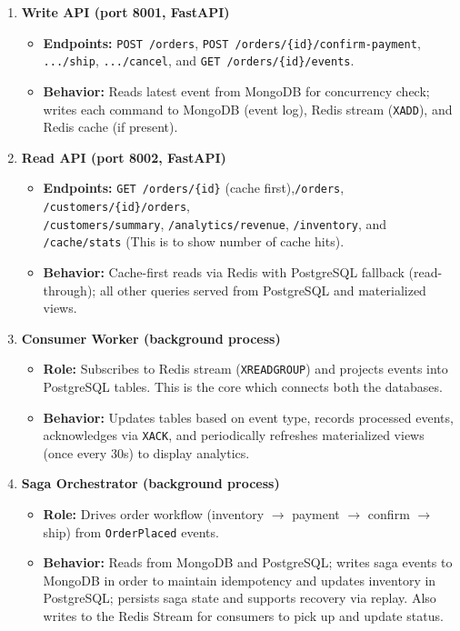 \documentclass[11pt,a4paper]{article}
\newcommand{\code}[1]{\texttt{\small #1}}
\begin{document}
\begin{enumerate}

  \item \textbf{Write API (port 8001, FastAPI)}
  \begin{itemize}
    \item \textbf{Endpoints:} \code{POST /orders}, \code{POST /orders/\{id\}/confirm-payment}, \code{.../ship}, \code{.../cancel}, and \code{GET /orders/\{id\}/events}.
    \item \textbf{Behavior:} Reads latest event from MongoDB for concurrency check; writes each command to MongoDB (event log), Redis stream (\code{XADD}), and Redis cache (if present).
  \end{itemize}

  \item \textbf{Read API (port 8002, FastAPI)}
  \begin{itemize}
    \item \textbf{Endpoints:} \code{GET /orders/\{id\}} (cache first),\code{/orders}, \code{/customers/\{id\}/orders}, \\\code{/customers/summary}, \code{/analytics/revenue}, \code{/inventory}, and \code{/cache/stats} (This is to show number of cache hits).
    \item \textbf{Behavior:} Cache-first reads via Redis with PostgreSQL fallback (read-through); all other queries served from PostgreSQL and materialized views.
  \end{itemize}

  \item \textbf{Consumer Worker (background process)}
  \begin{itemize}
    \item \textbf{Role:} Subscribes to Redis stream (\code{XREADGROUP}) and projects events into PostgreSQL tables. This is the core which connects both the databases.
    \item \textbf{Behavior:} Updates tables based on event type, records processed events, acknowledges via \code{XACK}, and periodically refreshes materialized views (once every 30s) to display analytics.
  \end{itemize}

  \item \textbf{Saga Orchestrator (background process)}
  \begin{itemize}
    \item \textbf{Role:} Drives order workflow (inventory $\rightarrow$ payment $\rightarrow$ confirm $\rightarrow$ ship) from \code{OrderPlaced} events.
    \item \textbf{Behavior:} Reads from MongoDB and PostgreSQL; writes saga events to MongoDB in order to maintain idempotency and updates inventory in PostgreSQL; persists saga state and supports recovery via replay. Also writes to the Redis Stream for consumers to pick up and update status.
  \end{itemize}


\end{enumerate}
\end{document}
